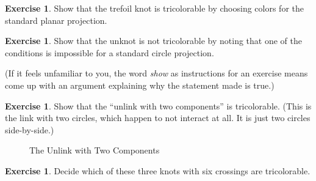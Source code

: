 \documentclass[12pt,letterpaper]{article}
\theoremstyle{definition}
\newtheorem{exercise}[question]{Exercise}
\begin{document}
\begin{exercise}
Show that the trefoil knot is tricolorable by choosing colors for the standard planar projection.
\end{exercise}

\begin{exercise}
Show that the unknot is not tricolorable by noting that one of the conditions is impossible for a standard circle projection.
\end{exercise}

(If it feels unfamiliar to you, the word \emph{show} as instructions for an exercise means come up with an argument explaining why the statement made is true.)

\begin{exercise}
Show that the ``unlink with two components'' is tricolorable.
(This is the link with two circles, which happen to not interact at all.
It is just two circles side-by-side.)
\end{exercise}

\begin{figure}[h]
    \centering
    \caption{The Unlink with Two Components}
\end{figure}




\clearpage

\begin{exercise}
Decide which of these three knots with six crossings are tricolorable.
\end{exercise}
\end{document}
